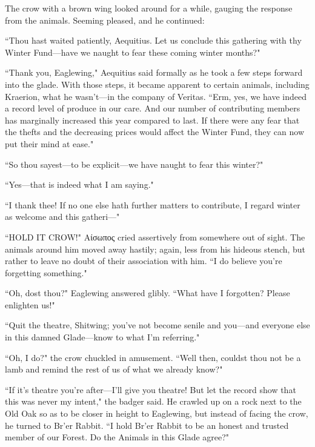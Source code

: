 

The crow with a brown wing looked around for a while, gauging the response from the animals.
Seeming pleased, and he continued:

``Thou hast waited patiently, Aequitius.
Let us conclude this gathering with thy Winter Fund---have we naught to fear these coming winter months?"

``Thank you, Eaglewing," Aequitius said formally as he took a few steps forward into the glade.
With those steps, it became apparent to certain animals, including Kraerion, what he wasn't---in the company of Veritas.
``Erm, yes, we have indeed a record level of produce in our care.
And our number of contributing members has marginally increased this year compared to last.
If there were any fear that the thefts and the decreasing prices would affect the Winter Fund, they can now put their mind at ease."


``So thou sayest---to be explicit---we have naught to fear this winter?"

``Yes---that is indeed what I am saying."

``I thank thee!
If no one else hath further matters to contribute, I regard winter as welcome and this gatheri---"

``HOLD IT CROW!" Αίσωπος cried assertively from somewhere out of sight.
The animals around him moved away hastily; again, less from his hideous stench, but rather to leave no doubt of their association with him. ``I do believe you're forgetting something."

``Oh, dost thou?" Eaglewing answered glibly.
``What have I forgotten?
Please enlighten us!"

``Quit the theatre, Shitwing; you've not become senile and you---and everyone else in this damned Glade---know to what I'm referring."

``Oh, I do?" the crow chuckled in amusement.
``Well then, couldst thou not be a lamb and remind the rest of us of what we already know?"

``If it's theatre you're after---I'll give you theatre!
But let the record show that this was never my intent," the badger said.
He crawled up on a rock next to the Old Oak so as to be closer in height to Eaglewing, but instead of facing the crow, he turned to Br'er Rabbit.
``I hold Br'er Rabbit to be an honest and trusted member of our Forest.
Do the Animals in this Glade agree?"

